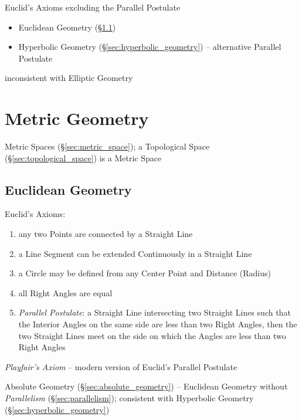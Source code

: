 Euclid's Axioms excluding the Parallel Postulate

\begin{itemize}
  \item Euclidean Geometry (\S\ref{sec:euclidean_geometry})
  \item Hyperbolic Geometry (\S\ref{sec:hyperbolic_geometry}) -- alternative
    Parallel Postulate
\end{itemize}

inconsistent with Elliptic Geometry



\section{Metric Geometry}\label{sec:metric_geometry}

Metric Spaces (\S\ref{sec:metric_space}); a Topological Space
(\S\ref{sec:topological_space}) is a Metric Space



\subsection{Euclidean Geometry}\label{sec:euclidean_geometry}

Euclid's Axioms:
\begin{enumerate}
  \item any two Points are connected by a Straight Line
  \item a Line Segment can be extended Continuously in a Straight Line
  \item a Circle may be defined from any Center Point and Distance (Radius)
  \item all Right Angles are equal
  \item \emph{Parallel Postulate}: a Straight Line intersecting two Straight
    Lines such that the Interior Angles on the same side are less than two Right
    Angles, then the two Straight Lines meet on the side on which the Angles are
    less than two Right Angles
\end{enumerate}

\emph{Playfair's Axiom} -- modern version of Euclid's Parallel Postulate

Absolute Geometry (\S\ref{sec:absolute_geometry}) -- Euclidean Geometry
without \emph{Parallelism} (\S\ref{sec:parallelism}); consistent with Hyperbolic
Geometry (\S\ref{sec:hyperbolic_geometry})

